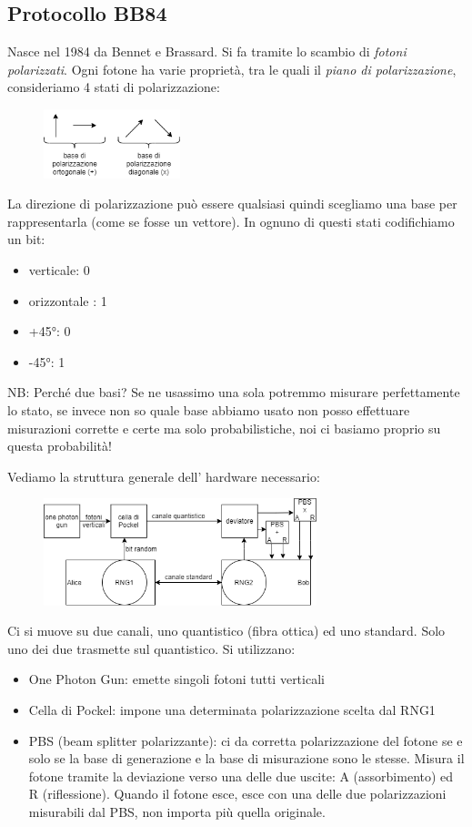 \subsection{Protocollo BB84}
Nasce nel 1984 da Bennet e Brassard.
Si fa tramite lo scambio di \emph{fotoni polarizzati}.
Ogni fotone ha varie proprietà, tra le quali il \emph{piano di polarizzazione}, consideriamo 4 stati di polarizzazione:

\begin{figure}[H]
    \centering
    \includegraphics[width=150px]{QDK_1.png}
\end{figure}

La direzione di polarizzazione può essere qualsiasi quindi scegliamo una base per rappresentarla (come se fosse un vettore).
In ognuno di questi stati codifichiamo un bit:
\begin{itemize}
    \item verticale: 0
    \item orizzontale : 1
    \item +45°: 0
    \item -45°: 1
\end{itemize}

NB: Perché due basi? Se ne usassimo una sola potremmo misurare perfettamente lo stato, se invece non so quale base abbiamo usato non posso effettuare misurazioni corrette e certe ma solo probabilistiche, noi ci basiamo proprio su questa probabilità!

Vediamo la struttura generale dell' hardware necessario:

\begin{figure}[H]
    \centering
    \includegraphics[width=300px]{QDK_2.png}
\end{figure}

Ci si muove su due canali, uno quantistico (fibra ottica) ed uno standard. Solo uno dei due trasmette sul quantistico. Si utilizzano:
\begin{itemize}
    \item One Photon Gun: emette singoli fotoni tutti verticali
    \item Cella di Pockel: impone una determinata polarizzazione scelta dal RNG1
    \item PBS (beam splitter polarizzante): ci da corretta polarizzazione del fotone se e solo se la base di generazione e la base di misurazione sono le stesse. Misura il fotone tramite la deviazione verso una delle due uscite: A (assorbimento) ed R (riflessione).
    Quando il fotone esce, esce con una delle due polarizzazioni misurabili dal PBS, non importa più quella originale.
\end{itemize}

